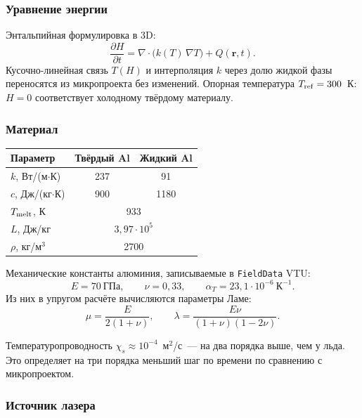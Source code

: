 \subsubsection{Уравнение энергии}

Энтальпийная формулировка в 3D:
\begin{equation}
  \frac{\partial H}{\partial t}
  = \nabla \cdot \bigl( k(T)\,\nabla T \bigr) + Q(\mathbf{r}, t).
\end{equation}
Кусочно-линейная связь $T(H)$ и интерполяция $k$ через долю жидкой
фазы переносятся из микропроекта без изменений. Опорная температура
$T_{\rm ref} = 300$~К: $H = 0$ соответствует холодному твёрдому
материалу.

\subsubsection{Материал}

\begin{center}
\begin{tabular}{lcc}
  \hline
  Параметр & Твёрдый Al & Жидкий Al \\
  \hline
  $k$, Вт/(м$\cdot$К) & 237 & 91 \\
  $c$, Дж/(кг$\cdot$К) & 900 & 1180 \\
  $T_{\rm melt}$, К & \multicolumn{2}{c}{933} \\
  $L$, Дж/кг & \multicolumn{2}{c}{$3{,}97 \cdot 10^{5}$} \\
  $\rho$, кг/м$^3$ & \multicolumn{2}{c}{2700} \\
  \hline
\end{tabular}
\end{center}

Механические константы алюминия, записываемые в \texttt{FieldData} VTU:
\[
  E = 70~\text{ГПа}, \qquad
  \nu = 0{,}33, \qquad
  \alpha_T = 23{,}1 \cdot 10^{-6}~\text{К}^{-1}.
\]
Из них в упругом расчёте вычисляются параметры Ламе:
\begin{equation}
  \mu = \frac{E}{2(1+\nu)}, \qquad
  \lambda = \frac{E\nu}{(1+\nu)(1-2\nu)}.
\end{equation}

Температуропроводность $\chi_s \approx 10^{-4}$~м$^2$/с~--- на два
порядка выше, чем у льда. Это определяет на три порядка меньший шаг
по времени по сравнению с микропроектом.

\subsubsection{Источник лазера}

